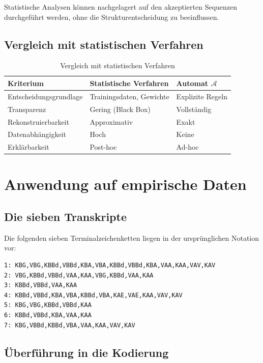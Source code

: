 \documentclass[
  12pt,
  a4paper,
  oneside,
  titlepage
]{article}
\begin{document}
Statistische Analysen können nachgelagert auf den akzeptierten 
Sequenzen durchgeführt werden, ohne die Strukturentscheidung zu 
beeinflussen.

\subsection{Vergleich mit statistischen Verfahren}

\begin{table}[h]
\centering
\caption{Vergleich mit statistischen Verfahren}
\label{tab:vergleich}
\begin{tabular}{@{} p{3cm} p{4cm} p{4cm} @{}}
\toprule
\textbf{Kriterium} & \textbf{Statistische Verfahren} & \textbf{Automat \(\mathcal{A}\)} \\
\midrule
Entscheidungsgrundlage & Trainingsdaten, Gewichte & Explizite Regeln \\
Transparenz & Gering (Black Box) & Vollständig \\
Rekonstruierbarkeit & Approximativ & Exakt \\
Datenabhängigkeit & Hoch & Keine \\
Erklärbarkeit & Post-hoc & Ad-hoc \\
\bottomrule
\end{tabular}
\end{table}

\section{Anwendung auf empirische Daten}

\subsection{Die sieben Transkripte}

Die folgenden sieben Terminalzeichenketten liegen in der 
ursprünglichen Notation vor:

\begin{verbatim}
1: KBG,VBG,KBBd,VBBd,KBA,VBA,KBBd,VBBd,KBA,VAA,KAA,VAV,KAV
2: VBG,KBBd,VBBd,VAA,KAA,VBG,KBBd,VAA,KAA
3: KBBd,VBBd,VAA,KAA
4: KBBd,VBBd,KBA,VBA,KBBd,VBA,KAE,VAE,KAA,VAV,KAV
5: KBG,VBG,KBBd,VBBd,KAA
6: KBBd,VBBd,KBA,VAA,KAA
7: KBG,VBBd,KBBd,VBA,VAA,KAA,VAV,KAV
\end{verbatim}

\subsection{Überführung in die Kodierung}
\end{document}
